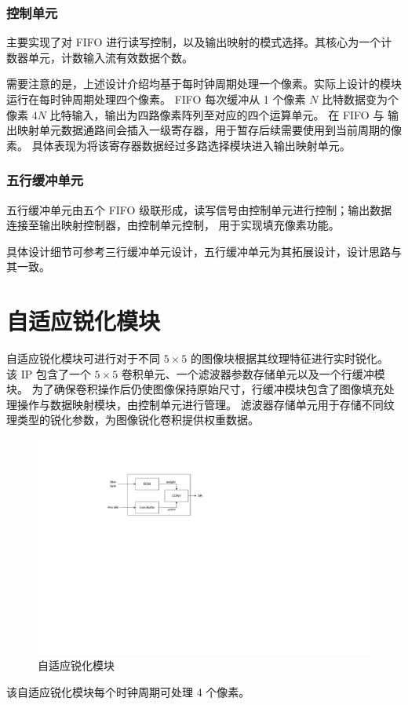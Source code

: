 \documentclass[12pt, a4paper, oneside]{ctexbook}
\begin{document}
	\subsubsection{控制单元}
	主要实现了对 FIFO 进行读写控制，以及输出映射的模式选择。其核心为一个计数器单元，计数输入流有效数据个数。
	\par 需要注意的是，上述设计介绍均基于每时钟周期处理一个像素。实际上设计的模块运行在每时钟周期处理四个像素。
	FIFO 每次缓冲从 1 个像素 $N$ 比特数据变为个像素 $4N$ 比特输入，输出为四路像素阵列至对应的四个运算单元。
	在 FIFO 与 输出映射单元数据通路间会插入一级寄存器，用于暂存后续需要使用到当前周期的像素。
	具体表现为将该寄存器数据经过多路选择模块进入输出映射单元。
	\subsubsection{五行缓冲单元}
	五行缓冲单元由五个 FIFO 级联形成，读写信号由控制单元进行控制；输出数据连接至输出映射控制器，由控制单元控制，
	用于实现填充像素功能。\par 具体设计细节可参考三行缓冲单元设计，五行缓冲单元为其拓展设计，设计思路与其一致。
	
	\section{自适应锐化模块}
	自适应锐化模块可进行对于不同 $5\times5$ 的图像块根据其纹理特征进行实时锐化。
	该 IP 包含了一个 $5\times5$ 卷积单元、一个滤波器参数存储单元以及一个行缓冲模块。
	为了确保卷积操作后仍使图像保持原始尺寸，行缓冲模块包含了图像填充处理操作与数据映射模块，由控制单元进行管理。
	滤波器存储单元用于存储不同纹理类型的锐化参数，为图像锐化卷积提供权重数据。
		\begin{figure}[h]
		\centering
		\includegraphics[scale=1]{pic/adapt.pdf}
		\caption{自适应锐化模块}
		\end{figure}	
	\par 该自适应锐化模块每个时钟周期可处理 4 个像素。
\end{document}
